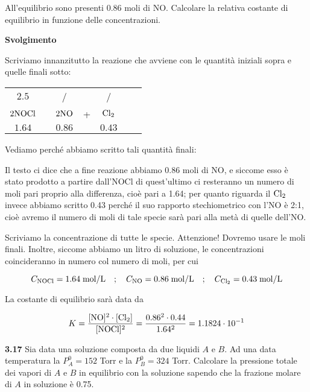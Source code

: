 \begin{center}
\end{center}

All'equilibrio sono presenti 0.86 moli di NO. Calcolare la relativa costante di equilibrio in funzione delle concentrazioni.

\vspace{0.2cm}\large\textbf{Svolgimento}\normalsize

\vspace{0.2cm}Scriviamo innanzitutto la reazione che avviene con le quantità iniziali sopra e quelle finali sotto: 

\begin{center}
    \begin{tabular}{ccccccc}
        $2.5$ & & / & & /\\
        $\rm 2NOCl$ & \ce{<-->} & $\rm 2NO$ & + & $\rm Cl_2$\\
        $1.64$ & & $0.86$ & & $0.43$\\
    \end{tabular}
\end{center}

Vediamo perché abbiamo scritto tali quantità finali:

Il testo ci dice che a fine reazione abbiamo 0.86 moli di NO, e siccome esso è stato prodotto a partire dall'NOCl di quest'ultimo ci resteranno un numero di moli pari proprio alla differenza, cioè pari a 1.64; per quanto riguarda il $\rm Cl_2$ invece abbiamo scritto 0.43 perché il suo rapporto stechiometrico con l'NO è 2:1, cioè avremo il numero di moli di tale specie sarà pari alla metà di quelle dell'NO.

Scriviamo la concentrazione di tutte le specie. Attenzione! Dovremo usare le moli finali. Inoltre, siccome abbiamo un litro di soluzione, le concentrazioni coincideranno in numero col numero di moli, per cui

$$C_{\rm NOCl}=1.64 \; \text{mol/L}
\quad;\quad
C_{\rm NO}=0.86 \; \text{mol/L}
\quad;\quad
C_{\rm Cl_2}=0.43 \; \text{mol/L}$$

La costante di equilibrio sarà data da

$$K=\rm \frac{[NO]^2 \cdot [Cl_2]}{[NOCl]^2}
=\frac{0.86^2 \cdot 0.44}{1.64^2}=1.1824 \cdot 10^{-1}$$

\vspace{0.2cm}\textbf{3.17} Sia data una soluzione composta da due liquidi $A$ e $B$. Ad una data temperatura la $P^0_A = 152$ Torr
e la $P^0_B = 324$ Torr. Calcolare la pressione totale dei vapori di $A$ e $B$ in equilibrio con la soluzione sapendo che la frazione molare di $A$ in soluzione è 0.75.

